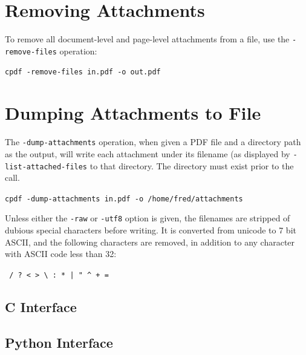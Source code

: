 \documentclass{book}
\begin{document}
  \section{Removing Attachments}
   To remove all document-level and page-level attachments from a file, use the \texttt{-remove-files} operation:
  \begin{framed}
    \noindent\small\verb!cpdf -remove-files in.pdf -o out.pdf!
  \end{framed}

\section{Dumping Attachments to File}

The \texttt{-dump-attachments} operation, when given a PDF file and a directory path as the output, will write each attachment under its filename (as displayed by \texttt{-list-attached-files} to that directory. The directory must exist prior to the call.

  \begin{framed}
    \noindent\small\verb!cpdf -dump-attachments in.pdf -o /home/fred/attachments!
  \end{framed}

\noindent  Unless either the \texttt{-raw} or \texttt{-utf8} option is given, the filenames are stripped of dubious special characters before writing. It is converted from unicode to 7 bit ASCII, and the following characters are removed, in addition to any character with ASCII code less than 32:
  \begin{framed}
  \centering
  \verb! / ? < > \ : * | " ^ + =!
  \end{framed}


\begin{cpdflib}
\clearpage
\section*{C Interface}
\begin{small}\tt

\end{small}
\end{cpdflib}

\begin{pycpdflib}
\clearpage
\section*{Python Interface}
\begin{small}\tt

\end{small}
\end{pycpdflib}
\end{document}
